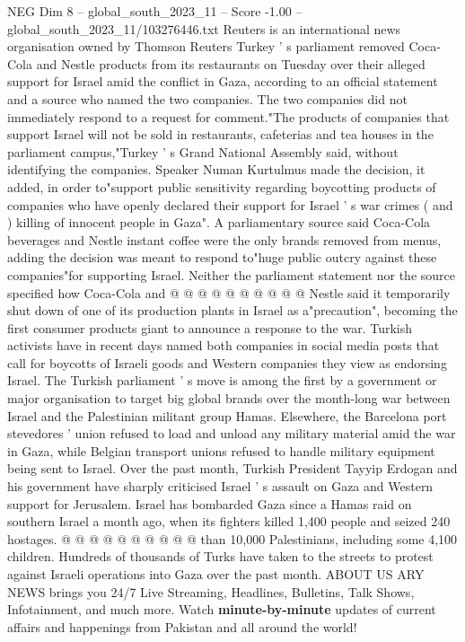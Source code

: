 \begin{textsample}{NEG Dim 8 – global\_south\_2023\_11 – Score -1.00 – global\_south\_2023\_11/103276446.txt}  \label{ex:f8_neg_082}
Reuters is an international news organisation owned by Thomson Reuters Turkey ' s parliament removed Coca-Cola and Nestle products from its restaurants on Tuesday over their alleged support for Israel amid the conflict in Gaza, according to an official statement and a source who named the two companies.
The two companies did not immediately respond to a request for comment."The products of companies that support Israel will not be sold in restaurants, cafeterias and tea houses in the parliament campus,"Turkey ' s Grand National Assembly said, without identifying the companies.
Speaker Numan Kurtulmus made the decision, it added, in order to"support public sensitivity regarding boycotting products of companies who have openly declared their support for Israel ' s war crimes ( and ) killing of innocent people in Gaza".
A parliamentary source said Coca-Cola beverages and Nestle instant coffee were the only brands removed from menus, adding the decision was meant to respond to"huge public outcry against these companies"for supporting Israel.
Neither the parliament statement nor the source specified how Coca-Cola and @ @ @ @ @ @ @ @ @ @ Nestle said it temporarily shut down of one of its production plants in Israel as a"precaution", becoming the first consumer products giant to announce a response to the war.
Turkish activists have in recent days named both companies in social media posts that call for boycotts of Israeli goods and Western companies they view as endorsing Israel.
The Turkish parliament ' s move is among the first by a government or major organisation to target big global brands over the month-long war between Israel and the Palestinian militant group Hamas.
Elsewhere, the Barcelona port stevedores ' union refused to load and unload any military material amid the war in Gaza, while Belgian transport unions refused to handle military equipment being sent to Israel.
Over the past month, Turkish President Tayyip Erdogan and his government have sharply criticised Israel ' s assault on Gaza and Western support for Jerusalem.
Israel has bombarded Gaza since a Hamas raid on southern Israel a month ago, when its fighters killed 1,400 people and seized 240 hostages. @ @ @ @ @ @ @ @ @ @ than 10,000 Palestinians, including some 4,100 children.
Hundreds of thousands of Turks have taken to the streets to protest against Israeli operations into Gaza over the past month.
ABOUT US ARY NEWS brings you 24/7 Live Streaming, Headlines, Bulletins, Talk Shows, Infotainment, and much more.
Watch \textbf{minute-by-minute} updates of current affairs and happenings from Pakistan and all around the world!

\end{textsample}
